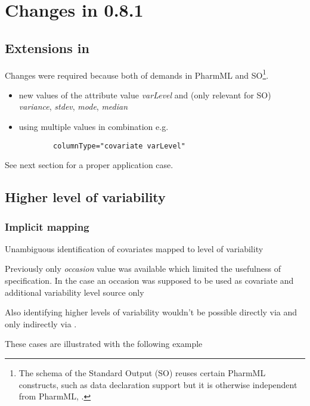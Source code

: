 
\chapter{Changes in 0.8.1}
\label{ch:081changes}


\section{Extensions in  }
Changes were required because both of demands in PharmML and SO\footnote{The schema 
of the Standard Output (SO) reuses certain PharmML constructs, such as data declaration 
support but it is otherwise independent from PharmML, \cite{SO:2016b}.}.

\begin{itemize}
\item 
new values of the  attribute value \emph{varLevel} and (only relevant for SO) \emph{variance}, \emph{stdev}, \emph{mode}, \emph{median	}
\item
using multiple values in combination e.g.
\lstset{language=XML}
\begin{lstlisting}
		columnType="covariate varLevel"
\end{lstlisting}
\end{itemize}
See next section for a proper application case.


\section{Higher level of variability}

\subsection{Implicit mapping}

Unambiguous identification of covariates mapped to level of variability 

Previously only \emph{occasion} value was available which limited the usefulness
of  specification. In the case an occasion was supposed to 
be used as covariate and additional variability level source only 

Also identifying higher levels of variability wouldn't be possible directly 
via  and only indirectly via .

These cases are illustrated with the following example

